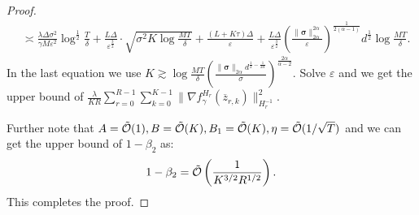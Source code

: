 \documentclass{article} %
\numberwithin{equation}{section}
\begin{document}
\begin{proof}
\begin{equation}
\begin{aligned}
            &\asymp \frac{\lambda\Delta\sigma^2}{\gamma M\varepsilon^2}\log^{\frac{1}{2}}\frac{T}{\delta} + \frac{L\Delta}{\varepsilon^{\frac{3}{2}}}\cdot \sqrt{\sigma^2K\log\frac{MT}{\delta}} + \frac{(L+K\tau)\Delta}{\varepsilon} + \frac{L\Delta}{\varepsilon^{\frac{3}{2}}}\left(\frac{\|\boldsymbol{\sigma}\|_{2\alpha}^{2\alpha}}{\varepsilon}\right)^{\frac{1}{2(\alpha-1)}}d^{\frac{1}{2}}\log\frac{MT}{\delta}.
        \end{aligned}
    \end{equation}
    In the last equation we use $K\gtrsim \log\frac{MT}{\delta}\left(\frac{\|\boldsymbol{\sigma}\|_{2\alpha}d^{\frac{1}{2}-\frac{1}{2\alpha}}}{\sigma}\right)^{\frac{2\alpha}{\alpha-2}}$.
    Solve $\varepsilon$ and we get the upper bound of $\frac{\lambda}{KR}\sum_{r=0}^{R-1}\sum_{k=0}^{K-1}\|\nabla f_\gamma^{H_r}(\overline{z}_{r,k}) \|_{H_r^{-1}}^2$.

    Further note that $A=\Tilde{\mathcal{O}}(1), B=\Tilde{\mathcal{O}}(K), B_1=\Tilde{\mathcal{O}}(K), \eta=\Tilde{\mathcal{O}}(1/\sqrt{T})$ and we can get the upper bound of $1-\beta_2$ as:
    \begin{equation}
        1-\beta_2 = \Tilde{\mathcal{O}}\left(\frac{1}{K^{3/2}R^{1/2}}\right).
    \end{equation}
    This completes the proof.
\end{proof}
\end{document}
